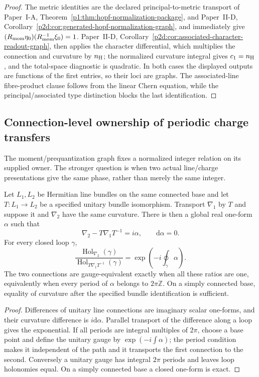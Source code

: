\documentclass[12pt,a4paper]{article}
\begin{document}
\begin{proof}
The metric identities are the declared principal-to-metric transport of
Paper~I-A, Theorem~\ref{p1:thm:hopf-normalization-package}, and Paper~II-D,
Corollary~\ref{p2d:cor:generated-hopf-normalization-graph}, and
immediately give
\((R_{\mathrm{mom}}\eta_0)(R_{\mathrm{mom}}^{-1}\xi_0)=1\).
Paper~II-D, Corollary~\ref{p2d:cor:associated-character-readout-graph},
then applies the character differential, which multiplies the connection and
curvature by \(n_{\rm H}\); the normalized curvature integral gives
\(c_1=n_{\rm H}\), and the total-space diagnostic is quadratic.  In both
cases the displayed outputs are functions of the first entries, so their
loci are graphs.  The associated-line fibre-product clause follows from the
linear Chern equation, while the principal/associated type distinction blocks
the last identification.
\end{proof}


\subsection{Connection-level ownership of periodic charge transfers}

\label{p2e:sec:v2210-lit-line-ownership}
The moment/prequantization graph fixes a normalized integer relation on its
supplied owner.  The stronger question is when two actual line/charge
presentations give the same phase, rather than merely the same integer.

\begin{theorem}
\label{p2e:thm:v2210-lit-line-holonomy}
Let $L_1,L_2$ be Hermitian line bundles on the same connected base and
let $T:L_1\to L_2$ be a specified unitary bundle isomorphism.  Transport
$\nabla_1$ by $T$ and suppose it and $\nabla_2$ have the same curvature.
There is then a global real one-form $\alpha$ such that
\[
 \nabla_2-T\nabla_1T^{-1}=i\alpha,\qquad \mathrm d\alpha=0.
\]
For every closed loop $\gamma$,
\[
 \frac{\operatorname{Hol}_{\nabla_2}(\gamma)}
 {\operatorname{Hol}_{T\nabla_1T^{-1}}(\gamma)}
 =\exp\left(-i\oint_\gamma\alpha\right).
\]
The two connections are gauge-equivalent exactly when all these ratios are
one, equivalently when every period of $\alpha$ belongs to $2\pi\mathbb Z$.
On a simply connected base, equality of curvature after the specified
bundle identification is sufficient.
\end{theorem}
\begin{proof}
Differences of unitary line connections are imaginary scalar one-forms,
and their curvature difference is $i\mathrm d\alpha$.  Parallel transport
of the difference along a loop gives the exponential.  If all periods are
integral multiples of $2\pi$, choose a base point and define the unitary
gauge by $\exp(-i\int\alpha)$; the period condition makes it independent
of the path and it transports the first connection to the second.
Conversely a unitary gauge has integral $2\pi$ periods and leaves loop
holonomies equal.  On a simply connected base a closed one-form is exact.
\end{proof}
\end{document}

